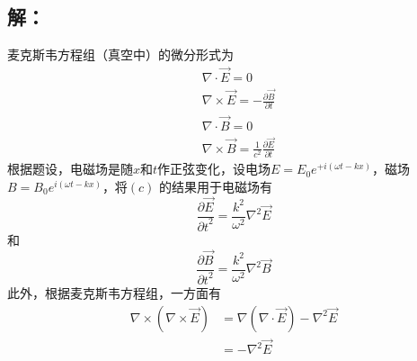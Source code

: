 \documentclass[10pt,a4paper]{article}
\theoremstyle{remark}
\begin{document}
\subsection{解：}
麦克斯韦方程组（真空中）的微分形式为
\begin{subequations}
\begin{align}
\label{GaussTheorem}&\nabla\cdot\overrightarrow{E} = 0\\
\label{FaradayLawofElectromagneticInduction}&\nabla\times\overrightarrow{E} = - \frac{\partial\overrightarrow{B}}{\partial t}\\
\label{GaussTheoremforMagnetism}&\nabla\cdot\overrightarrow{B} = 0\\
\label{AmpereCircuitalTheorem}&\nabla\times\overrightarrow{B} = \frac{1}{c^2}\frac{\partial\overrightarrow{E}}{\partial t}
\end{align}
\end{subequations}
根据题设，电磁场是随$x$和$t$作正弦变化，设电场$E = E_0e^{+i(\omega t-kx)}$，磁场$B = B_0e^{i(\omega t-kx)}$，将$(c)$ 的结果用于电磁场有
\begin{equation}
\label{E}
\frac{\partial\overrightarrow{E}}{{\partial t}^2} = \frac{k^2}{\omega^2}\nabla^2\overrightarrow{E}
\end{equation}
和
\begin{equation}
\label{B}
\frac{\partial\overrightarrow{B}}{{\partial t}^2} = \frac{k^2}{\omega^2}\nabla^2\overrightarrow{B}
\end{equation}
此外，根据麦克斯韦方程组，一方面有%
\begin{equation}
\label{OnTheOneHand}
\begin{split}
\nabla\times(\nabla\times \overrightarrow{E}) &= \nabla(\nabla\cdot\overrightarrow{E}) - \nabla^2\overrightarrow{E}\\
&= - \nabla^2\overrightarrow{E}
\end{split}
\end{equation}
\end{document}
